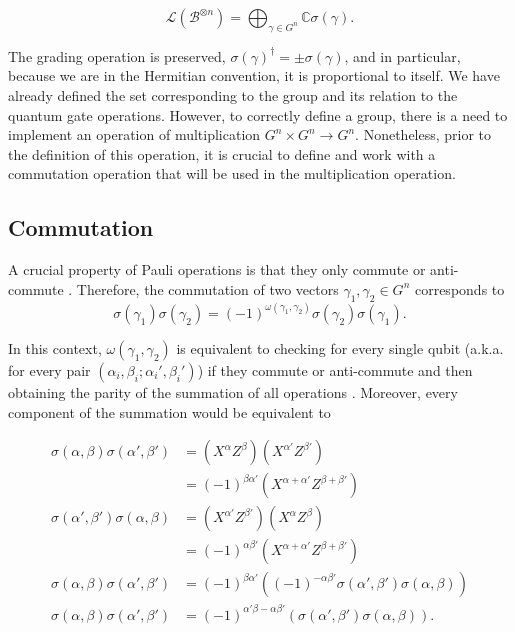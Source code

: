 \begin{equation}
  \mathcal{L}(\mathcal{B}^{\otimes n}) = \bigoplus_{\gamma \in G^n} \mathbb{C}\sigma(\gamma)
.\end{equation}

The grading operation is preserved, $\sigma(\gamma)^{\dagger} = \pm \sigma(\gamma)$, and in particular, because we are in the Hermitian convention, it is proportional to itself. We have already defined the set corresponding to the group and its relation to the quantum gate operations. However, to correctly define a group, there is a need to implement an operation of multiplication $G^n \times G^n \to G^n$. Nonetheless, prior to the definition of this operation, it is crucial to define and work with a commutation operation that will be used in the multiplication operation.

\subsection{Commutation}

A crucial property of Pauli operations is that they only commute or anti-commute \citep{Kitaev2002}. Therefore, the commutation of two vectors $\gamma_1, \gamma_2 \in G^n$ corresponds to 
\begin{equation}
  \sigma(\gamma_1)\sigma(\gamma_2) = (-1)^{\omega(\gamma_1, \gamma_2)}\sigma(\gamma_2)\sigma(\gamma_1)
.\end{equation}

In this context, $\omega(\gamma_1, \gamma_2)$ is equivalent to checking for every single qubit (a.k.a. for every pair $(\alpha_i, \beta_i; \alpha_i', \beta_i')$) if they commute or anti-commute and then obtaining the parity of the summation of all operations \citep{Kitaev2002}. Moreover, every component of the summation would be equivalent to

\begin{align*}
  \sigma(\alpha, \beta) \sigma(\alpha', \beta') &= (X^\alpha Z^\beta)(X^{\alpha'} Z^{\beta'})\\
  &= (-1)^{\beta\alpha'}(X^{\alpha + \alpha'} Z^{\beta + \beta'})\\
  \sigma(\alpha', \beta') \sigma(\alpha, \beta) &= (X^{\alpha'} Z^{\beta'})(X^\alpha Z^\beta)\\
  &= (-1)^{\alpha\beta'}(X^{\alpha + \alpha'} Z^{\beta + \beta'})\\
  \sigma(\alpha, \beta) \sigma(\alpha', \beta') &= (-1)^{\beta\alpha'}((-1)^{-\alpha\beta'} \sigma(\alpha', \beta') \sigma(\alpha, \beta))\\
  \sigma(\alpha, \beta) \sigma(\alpha', \beta') &= (-1)^{\alpha'\beta - \alpha\beta'} (\sigma(\alpha', \beta') \sigma(\alpha, \beta))
.\end{align*}

